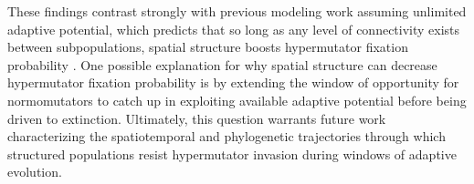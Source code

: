 These findings contrast strongly with previous modeling work assuming unlimited adaptive potential, which predicts that so long as any level of connectivity exists between subpopulations, spatial structure boosts hypermutator fixation probability \citep{raynes2019migration}.
One possible explanation for why spatial structure can decrease hypermutator fixation probability is by extending the window of opportunity for normomutators to catch up in exploiting available adaptive potential before being driven to extinction.
Ultimately, this question warrants future work characterizing the spatiotemporal and phylogenetic trajectories through which structured populations resist hypermutator invasion during windows of adaptive evolution.

